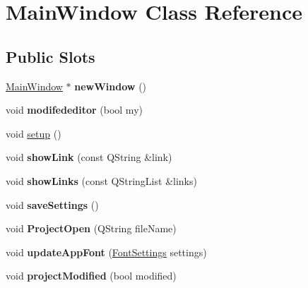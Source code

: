 \hypertarget{classMainWindow}{
\section{MainWindow Class Reference}
\label{classMainWindow}
}
\subsection*{Public Slots}
\begin{DoxyCompactItemize}
\item 
\hypertarget{classMainWindow_af7423b437ed71ee10803d3857cd0dc7a}{
\hyperlink{classMainWindow}{MainWindow} $\ast$ {\bfseries newWindow} ()}
\label{classMainWindow_af7423b437ed71ee10803d3857cd0dc7a}

\item 
\hypertarget{classMainWindow_ae3bc51b81925bc0d02c9093c60010207}{
void {\bfseries modifededitor} (bool my)}
\label{classMainWindow_ae3bc51b81925bc0d02c9093c60010207}

\item 
void \hyperlink{classMainWindow_ac5cfd506cc94aa8be3d4dd16146e7554}{setup} ()
\item 
\hypertarget{classMainWindow_a8e6d8e41dcf93acb34e681368d0131d0}{
void {\bfseries showLink} (const QString \&link)}
\label{classMainWindow_a8e6d8e41dcf93acb34e681368d0131d0}

\item 
\hypertarget{classMainWindow_a5ba3a8fccbd15ccd982c3473a9f1e4c3}{
void {\bfseries showLinks} (const QStringList \&links)}
\label{classMainWindow_a5ba3a8fccbd15ccd982c3473a9f1e4c3}

\item 
\hypertarget{classMainWindow_abb30531afee763d0586ee6323fd332e2}{
void {\bfseries saveSettings} ()}
\label{classMainWindow_abb30531afee763d0586ee6323fd332e2}

\item 
\hypertarget{classMainWindow_aa3878c22dc5200a1d1ad5977b0919cd2}{
void {\bfseries ProjectOpen} (QString fileName)}
\label{classMainWindow_aa3878c22dc5200a1d1ad5977b0919cd2}

\item 
\hypertarget{classMainWindow_a6c798c5cc4c75d1760f6f68650b0499e}{
void {\bfseries updateAppFont} (\hyperlink{structFontSettings}{FontSettings} settings)}
\label{classMainWindow_a6c798c5cc4c75d1760f6f68650b0499e}

\item 
\hypertarget{classMainWindow_a9bb1187d0e74b1b736a0d089dfbb5131}{
void {\bfseries projectModified} (bool modified)}
\label{classMainWindow_a9bb1187d0e74b1b736a0d089dfbb5131}

\end{DoxyCompactItemize}
